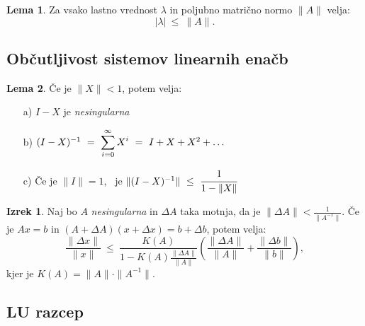 \documentclass[11pt]{article}
\theoremstyle{definition}
\newtheorem{lema}{Lema}
\newtheorem{izrek}{Izrek}
\begin{document}
\begin{lema}

Za vsako lastno vrednost $\lambda$ in poljubno matrično normo $\|A\|$ velja:
$$|\lambda| ~\leq~ \|A\|.$$

\end{lema} 
\vspace{0.5cm}


\subsection{Občutljivost sistemov linearnih enačb}
\vspace{0.5cm}

\begin{lema}

Če je $\|X\| < 1$, potem velja:
\begin{enumerate}
	\item[a)] $I-X$ je \textit{nesingularna}
	\item[b)] $(I-X)^{-1} ~=~ \mathlarger{\sum_{i=0}^{\infty} X ^i} ~=~ I + X + X^2 + \ldots$
	\item[c)] Če je $\|I\| = 1$, ~je $\|(I-X)^{-1}\| ~\leq~ \cfrac{1}{1-\|X\|}$
\end{enumerate}

\end{lema}
\vspace{0.5cm}

\begin{izrek}

Naj bo $A$ \textit{nesingularna} in $\Delta A$ taka motnja, da je $\|\Delta A\| < \frac{1}{\|A^{-1}\|}.$
Če je $Ax = b$ in $(A + \Delta A)(x + \Delta x) = b + \Delta b$, potem velja:
$$\frac{\|\Delta x\|}{\|x\|} ~\leq~ \frac{K(A)}{1 - K(A)\frac{\|\Delta A\|}{\|A\|}} \left( \frac{\|\Delta A\|}{\|A\|} + \frac{\|\Delta b\|}{\|b\|} \right),$$
kjer je $K(A) = \|A\| \cdot \|A^{-1}\|$.

\end{izrek}
\vspace{0.5cm}


\subsection{LU razcep}
\vspace{0.5cm}
\end{document}
